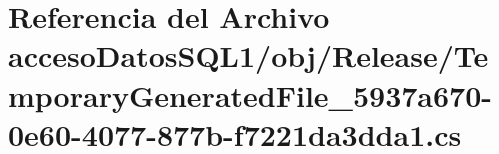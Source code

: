 \hypertarget{acceso_datos_s_q_l1_2obj_2_release_2_temporary_generated_file__5937a670-0e60-4077-877b-f7221da3dda1_8cs}{}\section{Referencia del Archivo acceso\+Datos\+S\+Q\+L1/obj/\+Release/\+Temporary\+Generated\+File\+\_\+5937a670-\/0e60-\/4077-\/877b-\/f7221da3dda1.cs}
\label{acceso_datos_s_q_l1_2obj_2_release_2_temporary_generated_file__5937a670-0e60-4077-877b-f7221da3dda1_8cs}
